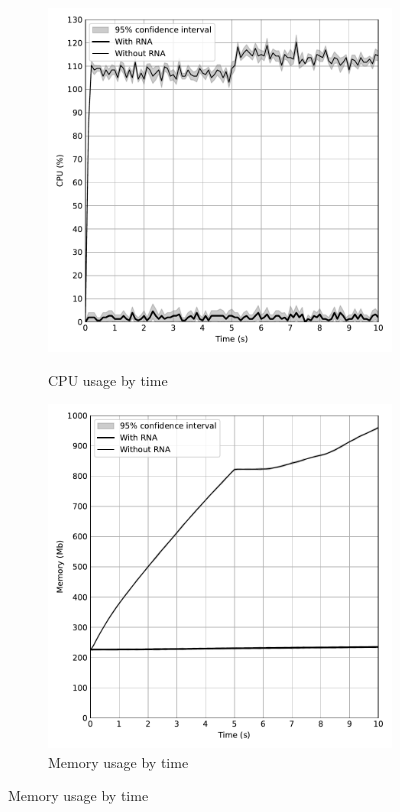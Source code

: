 \begin{figure}[htb]
    \caption{RNA Performance Evaluation}
    \begin{subfigure}{.5\textwidth}
        \centering
        \vspace{1em}
        \caption{CPU usage by time}
        \includegraphics[width=1.0\textwidth]{images/aggregated_cpu_plot.pdf}
        \label{fig:rna_cpu}
    \end{subfigure}%
    \begin{subfigure}{.5\textwidth}
        \centering
        \vspace{1em}
        \caption{Memory usage by time}
        \includegraphics[width=1.0\textwidth]{images/aggregated_memory_plot.pdf}

\end{subfigure}
\end{figure}
